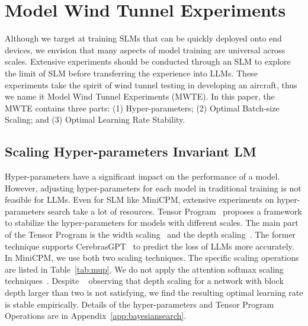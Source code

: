 

\section{Model Wind Tunnel Experiments}
\label{MWTE}
Although we target at training SLMs that can be quickly deployed onto end devices, we envision that many aspects of model training are universal across scales. Extensive experiments should be conducted through an SLM to explore the limit of SLM before transferring the experience into LLMs. These experiments take the spirit of wind tunnel testing in developing an aircraft, thus we name it Model Wind Tunnel Experiments (MWTE). In this paper, the MWTE contains three parts: (1) Hyper-parameters; (2) Optimal Batch-size Scaling; and (3) Optimal Learning Rate Stability.

\subsection{Scaling Hyper-parameters Invariant LM}
Hyper-parameters have a significant impact on the performance of a model. However, adjusting hyper-parameters for each model in traditional training is not feasible for LLMs. Even for SLM like MiniCPM, extensive experiments on hyper-parameters search take a lot of resources. Tensor Program~\citep{yang2022tensor, yang2023tensor} proposes a framework to stabilize the hyper-parameters for models with different scales. The main part of the Tensor Program is the width scaling~\citep{yang2022tensor} and the depth scaling~\citep{yang2023tensor}. The former technique supports CerebrasGPT~\citep{dey2023cerebras} to predict the loss of LLMs more accurately. In MiniCPM, we use both two scaling techniques. The specific scaling operations are listed in Table~\ref{tab:mup}. We do not apply the attention softmax scaling techniques~\citep{yang2022tensor}. Despite ~\cite{yang2023tensor} observing that depth scaling for a network with block depth larger than two is not satisfying, we find the resulting optimal learning rate is stable empirically. Details of the hyper-parameters and Tensor Program Operations are in Appendix~\ref{app:bayesiansearch}.


